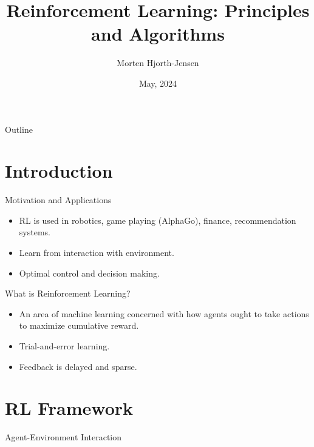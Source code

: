 \documentclass{beamer}
\title[Reinforcement Learning]{Reinforcement Learning: Principles and Algorithms}
\author{Morten Hjorth-Jensen}
\institute{Preliminary notes}
\date{May, 2024}
\begin{document}
\begin{frame}
 \titlepage
\end{frame}

\begin{frame}{Outline}
 \tableofcontents
\end{frame}

\section{Introduction}
\begin{frame}{Motivation and Applications}
 \begin{itemize}
   \item RL is used in robotics, game playing (AlphaGo), finance, recommendation systems.
   \item Learn from interaction with environment.
   \item Optimal control and decision making.
 \end{itemize}
\end{frame}

\begin{frame}{What is Reinforcement Learning?}
 \begin{itemize}
   \item An area of machine learning concerned with how agents ought to take actions to maximize cumulative reward.
   \item Trial-and-error learning.
   \item Feedback is delayed and sparse.
 \end{itemize}
\end{frame}

\section{RL Framework}
\begin{frame}{Agent-Environment Interaction}
 \centering
\end{frame}
\end{document}
